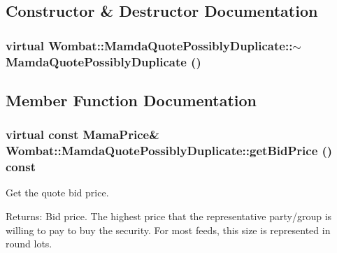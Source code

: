 \subsection{Constructor \& Destructor Documentation}
\hypertarget{classWombat_1_1MamdaQuotePossiblyDuplicate_fd1bd0fd3e206e3167ffba39ccd29dea}{
\subsubsection[$\sim$MamdaQuotePossiblyDuplicate]{\setlength{\rightskip}{0pt plus 5cm}virtual Wombat::Mamda\-Quote\-Possibly\-Duplicate::$\sim$Mamda\-Quote\-Possibly\-Duplicate ()}}
\label{classWombat_1_1MamdaQuotePossiblyDuplicate_fd1bd0fd3e206e3167ffba39ccd29dea}




\subsection{Member Function Documentation}
\hypertarget{classWombat_1_1MamdaQuotePossiblyDuplicate_789b485695d2da449c4e7eb5b38c9a90}{
\subsubsection[getBidPrice]{\setlength{\rightskip}{0pt plus 5cm}virtual const Mama\-Price\& Wombat::Mamda\-Quote\-Possibly\-Duplicate::get\-Bid\-Price () const}}
\label{classWombat_1_1MamdaQuotePossiblyDuplicate_789b485695d2da449c4e7eb5b38c9a90}


Get the quote bid price. 

\begin{Desc}
\item[Returns:]Bid price. The highest price that the representative party/group is willing to pay to buy the security. For most feeds, this size is represented in round lots. \end{Desc}



